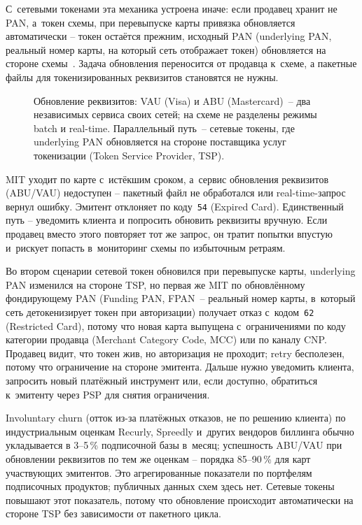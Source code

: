 С~сетевыми токенами эта механика устроена иначе: если продавец
хранит не PAN, а~токен схемы, при перевыпуске карты привязка
обновляется автоматически -- токен остаётся прежним, исходный PAN (underlying PAN, реальный номер карты, на который сеть отображает токен)
обновляется на стороне схемы~\cite{visa-lifecycle-management}. Задача обновления
переносится от продавца к~схеме, а пакетные файлы для токенизированных
реквизитов становятся не нужны.

\begin{figure}[tbp]
  \centering
  \caption{Обновление реквизитов: VAU (Visa) и ABU (Mastercard)~--
  два независимых сервиса своих сетей; на схеме не разделены режимы
  batch и real-time. Параллельный путь~-- сетевые токены, где
  underlying PAN обновляется на стороне поставщика услуг токенизации
  (Token Service Provider, TSP).}\label{fig:credential-update-flow}
\end{figure}

MIT уходит по карте с~истёкшим сроком, а~сервис
обновления реквизитов (ABU/VAU) недоступен -- пакетный файл
не обработался или real-time-запрос вернул ошибку.
Эмитент отклоняет по коду~\texttt{54} (Expired Card).
Единственный путь -- уведомить клиента и попросить обновить
реквизиты вручную. Если продавец вместо этого повторяет тот же
запрос, он тратит попытки впустую и~рискует попасть
в~мониторинг схемы по избыточным ретраям.

Во втором сценарии сетевой токен обновился при перевыпуске карты,
underlying PAN изменился на стороне TSP, но первая же MIT
по обновлённому фондирующему PAN (Funding PAN, FPAN~-- реальный номер карты,
в~который сеть детокенизирует токен при авторизации) получает отказ с~кодом~\texttt{62}
(Restricted Card), потому что новая карта выпущена с~ограничениями
по коду категории продавца (Merchant Category Code, MCC) или по каналу CNP.
Продавец видит, что токен жив, но авторизация не проходит;
retry бесполезен, потому что ограничение на стороне эмитента.
Дальше нужно уведомить клиента, запросить новый платёжный
инструмент или, если доступно, обратиться к~эмитенту через
PSP для снятия ограничения.

Involuntary churn (отток из-за платёжных отказов, не по решению
клиента) по индустриальным оценкам Recurly, Spreedly и~других
вендоров биллинга обычно укладывается в 3--5\,\% подписочной
базы в~месяц; успешность ABU/VAU при обновлении реквизитов
по тем же оценкам -- порядка 85--90\,\% для карт участвующих
эмитентов. Это агрегированные показатели по портфелям подписочных
продуктов; публичных данных схем здесь нет. Сетевые токены
повышают этот показатель, потому что обновление происходит
автоматически на стороне TSP без зависимости от пакетного цикла.

